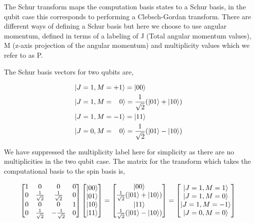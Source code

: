 \documentclass[12pt]{article}
\begin{document}
The Schur transform maps the computation basis states to a Schur basis, in the qubit case this corresponds to performing a Clebsch-Gordan transform. There are different ways of defining a Schur basis but here we choose to use angular momentum, defined in terms of a labeling of J (Total angular momentum values), M (z-axis projection of the angular momentum) and multiplicity values which we refer to as P.

The Schur basis vectors for two qubits are,

\begin{subequations}
\begin{align}
\begin{split}
&\left\vert{J=1, M=+1}\right\rangle = \left\vert{00}\right\rangle \\
&\left\vert{J=1, M=\;\;\;0}\right\rangle = \frac{1}{\sqrt{2}}(\left\vert{01}\right\rangle + \left\vert{10}\right\rangle) \\
&\left\vert{J=1, M=-1}\right\rangle = \left\vert{11}\right\rangle \\
\end{split}\\
\begin{split}
&\left\vert{J=0, M=\;\;\;0}\right\rangle = \frac{1}{\sqrt{2}}(\left\vert{01}\right\rangle - \left\vert{10}\right\rangle)\\
\end{split}
\end{align}
\end{subequations}

We have suppressed the multiplicity label here for simplicity as there are no multiplicities in the two qubit case. The matrix for the transform which takes the computational basis to the spin basis is,

\begin{align}
\begin{bmatrix}
1 & 0 & 0 & 0 \\
0 & \frac{1}{\sqrt{2}} & \frac{1}{\sqrt{2}} & 0 \\
0 & 0 & 0 & 1 \\
0 & \frac{1}{\sqrt{2}} & -\frac{1}{\sqrt{2}} & 0 \\
\end{bmatrix}
\begin{bmatrix}
\left\vert{00}\right\rangle \\
\left\vert{01}\right\rangle \\
\left\vert{10}\right\rangle \\
\left\vert{11}\right\rangle \\ 
\end{bmatrix}
=
\begin{bmatrix}
\left\vert{00}\right\rangle \\
\frac{1}{\sqrt{2}}(\left\vert{01}\right\rangle + \left\vert{10}\right\rangle) \\
\left\vert{11}\right\rangle \\
\frac{1}{\sqrt{2}}(\left\vert{01}\right\rangle - \left\vert{10}\right\rangle) \\ 
\end{bmatrix}
=
\begin{bmatrix}
\left\vert{J=1, M=1}\right\rangle \\
\left\vert{J=1, M=0}\right\rangle \\
\left\vert{J=1, M=-1}\right\rangle \\
\left\vert{J=0, M=0}\right\rangle \\ 
\end{bmatrix}
\end{align}
\end{document}
